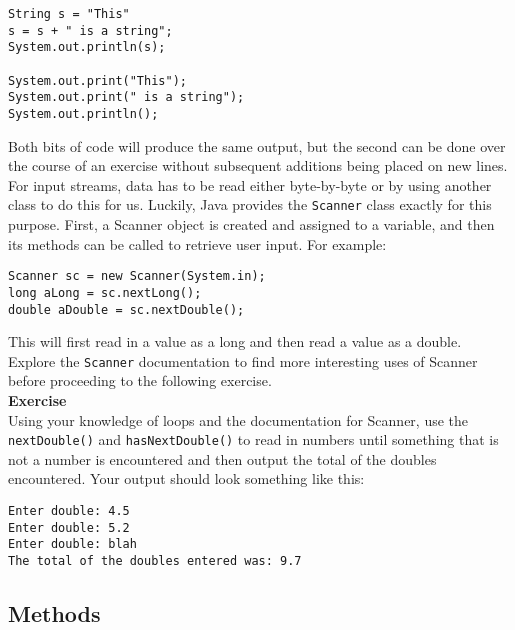 \begin{verbatim}
String s = "This"
s = s + " is a string";
System.out.println(s);

System.out.print("This");
System.out.print(" is a string");
System.out.println();
\end{verbatim}

\noindent
Both bits of code will produce the same output, but the second can be done over the course of an exercise without subsequent additions being placed on new lines.\\

\noindent
For input streams, data has to be read either byte-by-byte or by using another class to do this for us. Luckily, Java provides the {\tt Scanner} class exactly for this purpose. First, a Scanner object is created and assigned to a variable, and then its methods can be called to retrieve user input. For example:

\begin{verbatim}
Scanner sc = new Scanner(System.in);
long aLong = sc.nextLong();
double aDouble = sc.nextDouble();
\end{verbatim}

\noindent
This will first read in a value as a long and then read a value as a double. Explore the {\tt Scanner} documentation to find more interesting uses of Scanner before proceeding to the following exercise.\\

\noindent
{\bf Exercise}\\

\noindent
Using your knowledge of loops and the documentation for Scanner, use the {\tt nextDouble()} and {\tt hasNextDouble()} to read in numbers until something that is not a number is encountered and then output the total of the doubles encountered. Your output should look something like this:

\begin{verbatim}
Enter double: 4.5
Enter double: 5.2
Enter double: blah
The total of the doubles entered was: 9.7
\end{verbatim}

\subsection{Methods}


